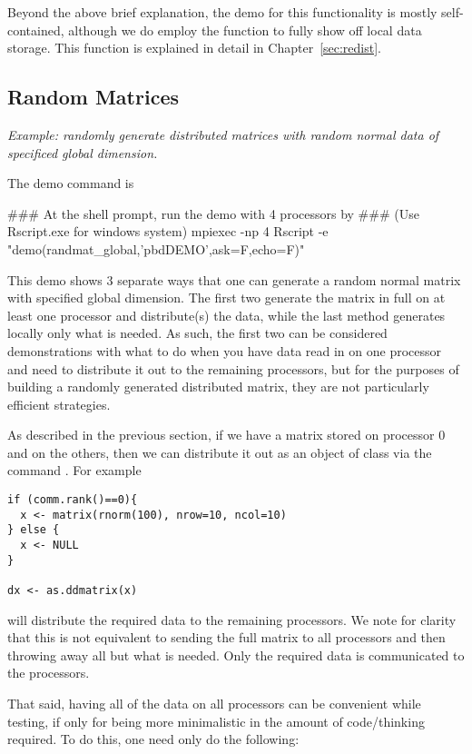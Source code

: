 Beyond the above brief explanation, the demo for this functionality is mostly self-contained, although we do employ the  function to fully show off local data storage.  This function is explained in detail in Chapter~\ref{sec:redist}.






\subsection{Random Matrices}\label{subsec:rng.gl}

\emph{Example:  randomly generate distributed matrices with random normal data of specificed global dimension.}

The demo command is
\begin{Command}
### At the shell prompt, run the demo with 4 processors by
### (Use Rscript.exe for windows system)
mpiexec -np 4 Rscript -e "demo(randmat_global,'pbdDEMO',ask=F,echo=F)"
\end{Command}

This demo shows 3 separate ways that one can generate a random normal matrix with specified global dimension.  The first two generate the matrix in full on at least one processor and distribute(s) the data, while the last method generates locally only what is needed.  As such, the first two can be considered demonstrations with what to do when you have data read in on one processor and need to distribute it out to the remaining processors, but for the purposes of building a randomly generated distributed matrix, they are not particularly efficient strategies.

As described in the previous section, if we have a matrix  stored on processor 0 and  on the others, then we can distribute it out as an object of class  via the command .  For example
\begin{lstlisting}[language=rr]
if (comm.rank()==0){
  x <- matrix(rnorm(100), nrow=10, ncol=10)
} else {
  x <- NULL
}

dx <- as.ddmatrix(x)
\end{lstlisting}

will distribute the required data to the remaining processors.  We note for clarity that this is not equivalent to sending the full matrix to all processors and then throwing away all but what is needed.  Only the required data is communicated to the processors.

That said, having all of the data on all processors can be convenient while testing, if only for being more minimalistic in the amount of code/thinking required.  To do this, one need only do the following:

